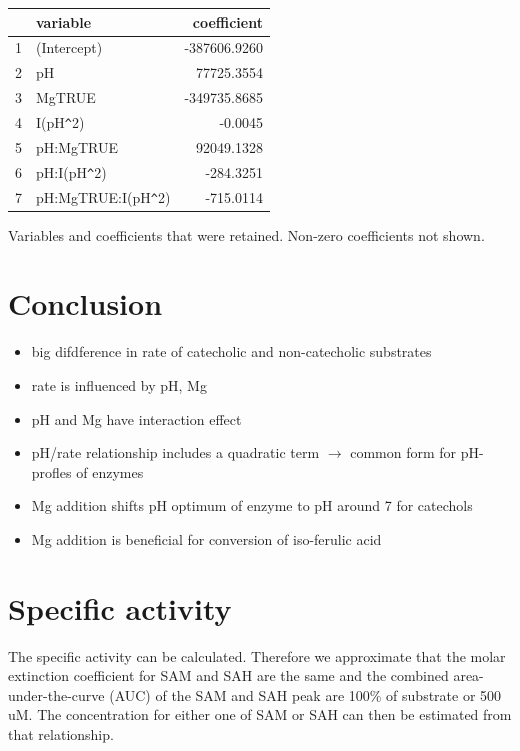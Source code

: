 \documentclass[]{tufte-handout}
\begin{document}
\begin{margintable}
\centering
\begin{tabular}{rlr}
  \toprule
 & variable & coefficient \\ 
  \midrule
1 & (Intercept) & -387606.9260 \\ 
  2 & pH & 77725.3554 \\ 
  3 & MgTRUE & -349735.8685 \\ 
  4 & I(pH\verb|^|2) & -0.0045 \\ 
  5 & pH:MgTRUE & 92049.1328 \\ 
  6 & pH:I(pH\verb|^|2) & -284.3251 \\ 
  7 & pH:MgTRUE:I(pH\verb|^|2) & -715.0114 \\ 
   \bottomrule
\end{tabular}
\caption{Variables and coefficients that were retained. Non-zero coefficients not shown.} 
\end{margintable}

\section{Conclusion}\label{conclusion}

\begin{itemize}
\itemsep1pt\parskip0pt
\item
  big difdference in rate of catecholic and non-catecholic substrates
\item
  rate is influenced by pH, Mg
\item
  pH and Mg have interaction effect
\item
  pH/rate relationship includes a quadratic term \(\rightarrow\) common
  form for pH-profles of enzymes
\item
  Mg addition shifts pH optimum of enzyme to pH around 7 for catechols
\item
  Mg addition is beneficial for conversion of iso-ferulic acid
\end{itemize}

\section{Specific activity}\label{specific-activity}

The specific activity can be calculated. Therefore we approximate that
the molar extinction coefficient for SAM and SAH are the same and the
combined area-under-the-curve (AUC) of the SAM and SAH peak are 100\% of
substrate or 500 uM. The concentration for either one of SAM or SAH can
then be estimated from that relationship.
\end{document}
